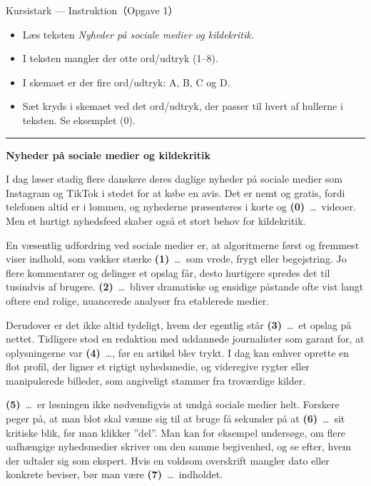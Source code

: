 \begin{emailbox}{Kursistark --- Instruktion（Opgave 1）}
\begin{itemize}
  \item Læs teksten \textit{Nyheder på sociale medier og kildekritik}.
  \item I teksten mangler der otte ord/udtryk (1--8).
  \item I skemaet er der fire ord/udtryk: A, B, C og D.
  \item Sæt kryds i skemaet ved det ord/udtryk, der passer til hvert af hullerne i teksten. Se eksemplet (0).
\end{itemize}

\vspace{0.35em}
\hrule
\vspace{0.45em}

\textbf{\color{NCDNavy}Nyheder på sociale medier og kildekritik}

\vspace{0.3em}
I dag læser stadig flere danskere deres daglige nyheder på sociale medier som Instagram og TikTok i stedet for at købe en avis. Det er nemt og gratis, fordi telefonen altid er i lommen, og nyhederne præsenteres i korte og \textbf{(0)}\ \ldots\ videoer. Men et hurtigt nyhedsfeed skaber også et stort behov for kildekritik.

\vspace{0.25em}
En væsentlig udfordring ved sociale medier er, at algoritmerne først og fremmest viser indhold, som vækker stærke \textbf{(1)}\ \ldots\ som vrede, frygt eller begejstring. Jo flere kommentarer og delinger et opslag får, desto hurtigere spredes det til tusindvis af brugere. \textbf{(2)}\ \ldots\ bliver dramatiske og ensidige påstande ofte vist langt oftere end rolige, nuancerede analyser fra etablerede medier.

\vspace{0.25em}
Derudover er det ikke altid tydeligt, hvem der egentlig står \textbf{(3)}\ \ldots\ et opslag på nettet. Tidligere stod en redaktion med uddannede journalister som garant for, at oplysningerne var \textbf{(4)}\ \ldots, før en artikel blev trykt. I dag kan enhver oprette en flot profil, der ligner et rigtigt nyhedsmedie, og videregive rygter eller manipulerede billeder, som angiveligt stammer fra troværdige kilder.

\vspace{0.25em}
\textbf{(5)}\ \ldots\ er løsningen ikke nødvendigvis at undgå sociale medier helt. Forskere peger på, at man blot skal vænne sig til at bruge få sekunder på at \textbf{(6)}\ \ldots\ sit kritiske blik, før man klikker ''del''. Man kan for eksempel undersøge, om flere uafhængige nyhedsmedier skriver om den samme begivenhed, og se efter, hvem der udtaler sig som ekspert. Hvis en voldsom overskrift mangler dato eller konkrete beviser, bør man være \textbf{(7)}\ \ldots\ indholdet.


\end{emailbox}
